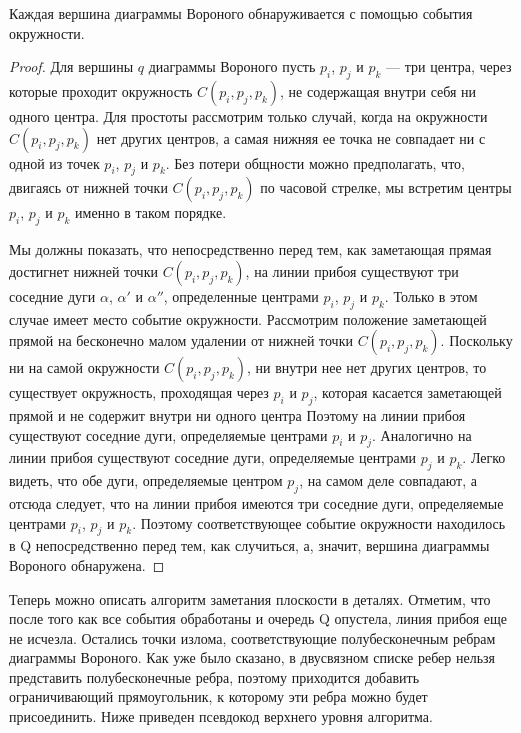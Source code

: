 \begin{lemma}
	Каждая  вершина  диаграммы  Вороного  обнаруживается  с  помощью события  окружности.
\end{lemma}
\begin{proof}
	Для  вершины  $q$  диаграммы  Вороного  пусть  $p_i$, $p_j$ и $p_k$ --- три  центра,  через  которые  проходит  окружность  $C(p_i, p_j, p_k)$,  не  содержащая  внутри  себя  ни одного  центра.
	Для  простоты  рассмотрим  только  случай,  когда  на  окружности  $C(p_i, p_j, p_k)$  нет  других  центров,  а  самая  нижняя  ее  точка  не  совпадает  ни  с  одной  из  точек $p_i$, $p_j$ и $p_k$.
	Без потери  общности  можно  предполагать,  что,  двигаясь  от  нижней  точки $C(p_i, p_j, p_k)$ по  часовой  стрелке,  мы  встретим  центры $p_i$, $p_j$ и $p_k$ именно  в  таком  порядке.
	
	Мы  должны  показать,  что  непосредственно  перед тем,  как  заметающая  прямая  достигнет  нижней  точки $C(p_i, p_j, p_k)$,  на  линии  прибоя  существуют  три  соседние дуги  $\alpha$, $\alpha'$ и $\alpha''$,  определенные  центрами $p_i$, $p_j$ и $p_k$.
	Только  в этом  случае  имеет  место  событие  окружности.  
	Рассмотрим  положение  заметающей  прямой  на  бесконечно малом  удалении  от  нижней  точки  $C(p_i, p_j, p_k)$.
	Поскольку  ни  на  самой  окружности  $C(p_i, p_j, p_k)$,  ни  внутри  нее нет  других  центров,  то  существует  окружность,  проходящая  через $p_i$ и $p_j$, которая касается  заметающей  прямой  и  не  содержит  внутри  ни  одного  центра
	Поэтому  на линии  прибоя  существуют  соседние  дуги,  определяемые  центрами  $p_i$ и $p_j$.
	Аналогично  на  линии  прибоя  существуют  соседние  дуги,  определяемые  центрами $p_j$ и $p_k$. 
	Легко  видеть,  что  обе  дуги,  определяемые  центром $p_j$, на  самом  деле  совпадают,  а отсюда  следует,  что  на  линии  прибоя  имеются  три  соседние  дуги,  определяемые центрами  $p_i$, $p_j$ и $p_k$.
	Поэтому  соответствующее  событие  окружности  находилось  в Q  непосредственно  перед  тем,  как  случиться,  а,  значит,  вершина  диаграммы  Вороного  обнаружена.
\end{proof}

Теперь  можно  описать  алгоритм  заметания  плоскости  в  деталях.
Отметим,  что после  того  как  все  события  обработаны  и  очередь  Q  опустела,  линия  прибоя  еще  не исчезла.
Остались  точки  излома,  соответствующие  полубесконечным  ребрам  диаграммы  Вороного.
Как  уже  было  сказано,  в  двусвязном  списке  ребер  нельзя  представить  полубесконечные  ребра,  поэтому  приходится  добавить  ограничивающий прямоугольник,  к  которому  эти  ребра  можно  будет  присоединить.
Ниже  приведен псевдокод  верхнего  уровня  алгоритма.

